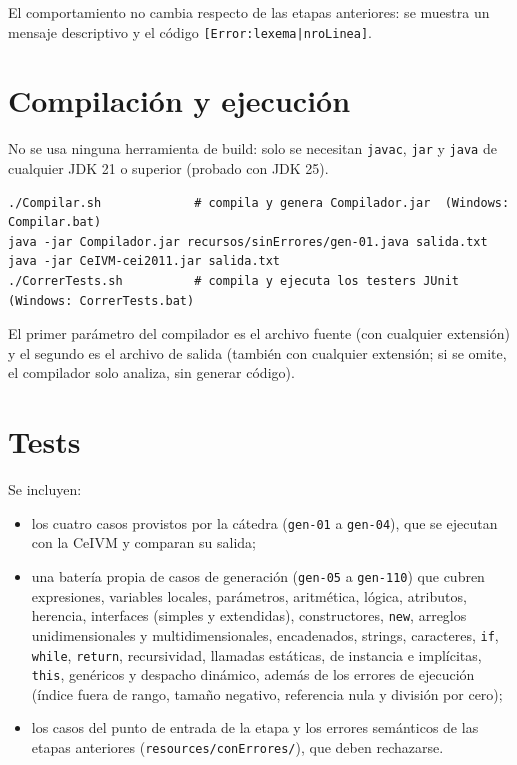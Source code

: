 \documentclass[11pt,a4paper]{article}
\begin{document}
El comportamiento no cambia respecto de las etapas anteriores: se muestra un
mensaje descriptivo y el código \texttt{[Error:lexema|nroLinea]}.

\section{Compilación y ejecución}

No se usa ninguna herramienta de build: solo se necesitan \texttt{javac},
\texttt{jar} y \texttt{java} de cualquier JDK 21 o superior (probado con JDK 25).

{\footnotesize
\begin{verbatim}
./Compilar.sh             # compila y genera Compilador.jar  (Windows: Compilar.bat)
java -jar Compilador.jar recursos/sinErrores/gen-01.java salida.txt
java -jar CeIVM-cei2011.jar salida.txt
./CorrerTests.sh          # compila y ejecuta los testers JUnit  (Windows: CorrerTests.bat)
\end{verbatim}
}

El primer parámetro del compilador es el archivo fuente (con cualquier extensión)
y el segundo es el archivo de salida (también con cualquier extensión; si se
omite, el compilador solo analiza, sin generar código).

\section{Tests}

Se incluyen:
\begin{itemize}
  \item los cuatro casos provistos por la cátedra (\texttt{gen-01} a
        \texttt{gen-04}), que se ejecutan con la CeIVM y comparan su salida;
  \item una batería propia de casos de generación (\texttt{gen-05} a
        \texttt{gen-110}) que cubren expresiones, variables locales,
        parámetros, aritmética, lógica, atributos, herencia, interfaces
        (simples y extendidas), constructores, \texttt{new}, arreglos
        unidimensionales y multidimensionales, encadenados, strings, caracteres,
        \texttt{if}, \texttt{while}, \texttt{return}, recursividad, llamadas
        estáticas, de instancia e implícitas, \texttt{this}, genéricos y
        despacho dinámico, además de los errores de ejecución (índice fuera de
        rango, tamaño negativo, referencia nula y división por cero);
  \item los casos del punto de entrada de la etapa y los errores semánticos de
        las etapas anteriores (\texttt{resources/conErrores/}), que deben
        rechazarse.
\end{itemize}
\end{document}
